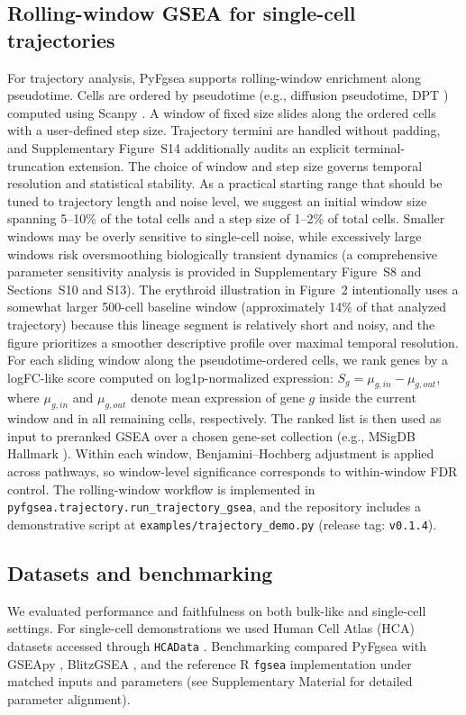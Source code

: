 \documentclass[numsec,webpdf,modern,large,numbered]{oup-authoring-template}
\newcommand{\rev}[1]{\textcolor{revisionred}{#1}}
\begin{document}
\subsection{Rolling-window GSEA for single-cell trajectories}
For trajectory analysis, PyFgsea supports rolling-window enrichment along pseudotime.
Cells are ordered by pseudotime (e.g., diffusion pseudotime, DPT \citep{Haghverdi2016DPT}) computed using Scanpy \citep{Wolf2018Scanpy}.
A window of fixed size slides along the ordered cells with a user-defined step size.
\rev{Trajectory termini are handled without padding, and Supplementary Figure~S14 additionally audits an explicit terminal-truncation extension. The choice of window and step size governs temporal resolution and statistical stability. As a practical starting range that should be tuned to trajectory length and noise level, we suggest an initial window size spanning 5--10\% of the total cells and a step size of 1--2\% of total cells. Smaller windows may be overly sensitive to single-cell noise, while excessively large windows risk oversmoothing biologically transient dynamics (a comprehensive parameter sensitivity analysis is provided in Supplementary Figure~S8 and Sections~S10 and S13). The erythroid illustration in Figure~2 intentionally uses a somewhat larger 500-cell baseline window (approximately 14\% of that analyzed trajectory) because this lineage segment is relatively short and noisy, and the figure prioritizes a smoother descriptive profile over maximal temporal resolution.}
For each sliding window along the pseudotime-ordered cells, we rank genes by a logFC-like score computed on log1p-normalized expression: $S_g = \mu_{g,in} - \mu_{g,out}$, where $\mu_{g,in}$ and $\mu_{g,out}$ denote mean expression of gene $g$ inside the current window and in all remaining cells, respectively.
The ranked list is then used as input to preranked GSEA over a chosen gene-set collection (e.g., MSigDB Hallmark \citep{Liberzon2015Hallmark,Liberzon2011MSigDB}).
\rev{Within each window, Benjamini--Hochberg adjustment is applied across pathways, so window-level significance corresponds to within-window FDR control. The rolling-window workflow is implemented in \texttt{pyfgsea.trajectory.run\_trajectory\_gsea}, and the repository includes a demonstrative script at \texttt{examples/trajectory\_demo.py} (release tag: \texttt{v0.1.4}).}

\subsection{Datasets and benchmarking}
We evaluated performance and faithfulness on both bulk-like and single-cell settings.
For single-cell demonstrations we used Human Cell Atlas (HCA) datasets \citep{Regev2017HCA} accessed through \texttt{HCAData} \citep{Marini2020HCAData}.
Benchmarking compared PyFgsea with GSEApy \citep{Fang2023GSEApy}, BlitzGSEA \citep{Lachmann2022blitzGSEA}, and the reference R \texttt{fgsea} implementation \citep{Korotkevich2021FGSEA} under matched inputs and parameters (see Supplementary Material for detailed parameter alignment).
\end{document}
